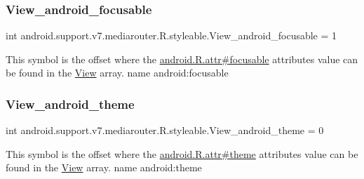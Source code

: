 \subsubsection{\texorpdfstring{View\+\_\+android\+\_\+focusable}{View\_android\_focusable}}
{\footnotesize\ttfamily int android.\+support.\+v7.\+mediarouter.\+R.\+styleable.\+View\+\_\+android\+\_\+focusable = 1\hspace{0.3cm}{\ttfamily [static]}}

This symbol is the offset where the \hyperlink{}{android.\+R.\+attr\#focusable} attribute\textquotesingle{}s value can be found in the \hyperlink{classandroid_1_1support_1_1v7_1_1mediarouter_1_1R_1_1styleable_a69727b595e0fa598a4ad38166ab404a9}{View} array.  name android\+:focusable \mbox{\label{classandroid_1_1support_1_1v7_1_1mediarouter_1_1R_1_1styleable_a9d71fcd300bcf0a9a2e237edd5d3a4b8}} 
\subsubsection{\texorpdfstring{View\+\_\+android\+\_\+theme}{View\_android\_theme}}
{\footnotesize\ttfamily int android.\+support.\+v7.\+mediarouter.\+R.\+styleable.\+View\+\_\+android\+\_\+theme = 0\hspace{0.3cm}{\ttfamily [static]}}

This symbol is the offset where the \hyperlink{}{android.\+R.\+attr\#theme} attribute\textquotesingle{}s value can be found in the \hyperlink{classandroid_1_1support_1_1v7_1_1mediarouter_1_1R_1_1styleable_a69727b595e0fa598a4ad38166ab404a9}{View} array.  name android\+:theme \mbox{\label{classandroid_1_1support_1_1v7_1_1mediarouter_1_1R_1_1styleable_a9f8c2722c7aba33ebb2dbe4eed4fa4b4}} 
